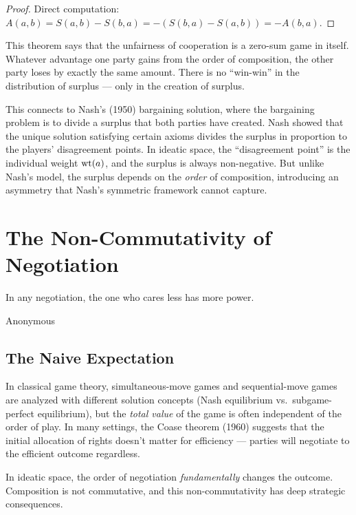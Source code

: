 \begin{proof}
Direct computation: $A(a,b) = S(a,b) - S(b,a) = -(S(b,a) - S(a,b)) = -A(b,a)$.
\end{proof}

\begin{remark}
This theorem says that the unfairness of cooperation is a zero-sum game in itself. Whatever advantage one party gains from the order of composition, the other party loses by exactly the same amount. There is no ``win-win'' in the distribution of surplus --- only in the creation of surplus.

This connects to Nash's (1950) bargaining solution, where the bargaining problem is to divide a surplus that both parties have created. Nash showed that the unique solution satisfying certain axioms divides the surplus in proportion to the players' disagreement points. In ideatic space, the ``disagreement point'' is the individual weight $\operatorname{wt}(a)$, and the surplus is always non-negative. But unlike Nash's model, the surplus depends on the \emph{order} of composition, introducing an asymmetry that Nash's symmetric framework cannot capture.
\end{remark}


\chapter{The Non-Commutativity of Negotiation}

\epigraph{In any negotiation, the one who cares less has more power.}{Anonymous}

\section{The Naive Expectation}

In classical game theory, simultaneous-move games and sequential-move games are analyzed with different solution concepts (Nash equilibrium vs.\ subgame-perfect equilibrium), but the \emph{total value} of the game is often independent of the order of play. In many settings, the Coase theorem (1960) suggests that the initial allocation of rights doesn't matter for efficiency --- parties will negotiate to the efficient outcome regardless.

In ideatic space, the order of negotiation \emph{fundamentally} changes the outcome. Composition is not commutative, and this non-commutativity has deep strategic consequences.

